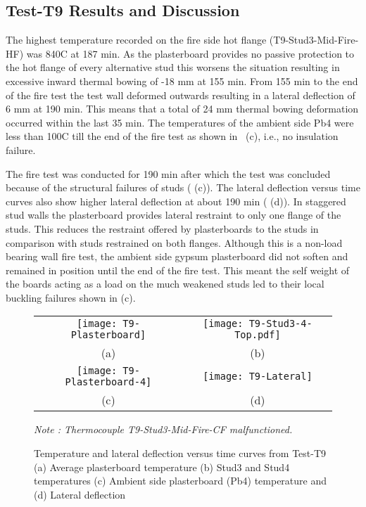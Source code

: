 \subsection{Test-T9 Results and Discussion}

The highest temperature recorded on the fire side hot flange (T9-Stud3-Mid-Fire-HF) was 840\degree C at 187 min. As the plasterboard provides no passive protection to the hot flange of every alternative stud this worsens the situation resulting in excessive inward thermal bowing of -18 mm at 155 min. From 155 min to the end of the fire test the test wall deformed outwards resulting in a lateral deflection of  6 mm at 190 min. This means that a total of 24 mm thermal bowing deformation occurred within the last 35 min. The temperatures of the ambient side Pb4 were less than 100\degree C till the end of the fire test as shown in ~(c), i.e., no insulation failure. 
 
The fire test was conducted for 190 min after which the test was concluded because of the structural failures of studs ( (c)). The lateral deflection versus time curves also show higher lateral deflection at about 190 min ( (d)). In staggered stud walls the plasterboard provides lateral restraint to only one flange of the studs. This reduces the restraint offered by plasterboards to the studs in comparison with studs restrained on both flanges. Although this is a non-load bearing wall fire test, the ambient side gypsum plasterboard did not soften and remained in position until the end of the fire test. This meant the self weight of the boards acting as a load on the much weakened studs led to their local buckling failures shown in (c).
\begin{figure}[!htbp]
	\centering
		\begin{tabular}{cc}
			\texttt{[image: T9-Plasterboard]} & \texttt{[image: T9-Stud3-4-Top.pdf]}\\
			(a) & (b)  \\ 
			 \texttt{[image: T9-Plasterboard-4]} & \texttt{[image: T9-Lateral]} \\ 
			(c) & (d)  \\ 
		\end{tabular} 
	\fontsize{10}{1}\textit{Note : Thermocouple T9-Stud3-Mid-Fire-CF malfunctioned.}
		\caption{Temperature and lateral deflection versus time curves from Test-T9 (a) Average plasterboard temperature (b) Stud3 and Stud4 temperatures (c) Ambient side plasterboard (Pb4) temperature and (d) Lateral deflection}
		\label{fig:T9-PB-Stud-Lateral}
\end{figure}

